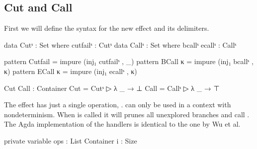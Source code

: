 \subsection{Cut and Call}

First we will define the syntax for the new effect and its delimiters.

\begin{code}
data Cutˢ : Set where cutfailˢ : Cutˢ
data Callˢ : Set where bcallˢ ecallˢ : Callˢ

pattern Cutfail = impure (inj₁ cutfailˢ , _)
pattern BCall κ = impure (inj₁ bcallˢ , κ)
pattern ECall κ = impure (inj₁ ecallˢ , κ)

Cut Call : Container
Cut   = Cutˢ    ▷ λ _ → ⊥
Call  = Callˢ   ▷ λ _ → ⊤
\end{code}
The  effect has just a single operation, .
 can only be used in a context with nondeterminism.
When  is called it will prunes all unexplored branches and
call .
The Agda implementation of the handlers is identical to the one by Wu et al.

\begin{code}[hide] %
private
  variable
    ops : List Container
    i : Size
\end{code}


